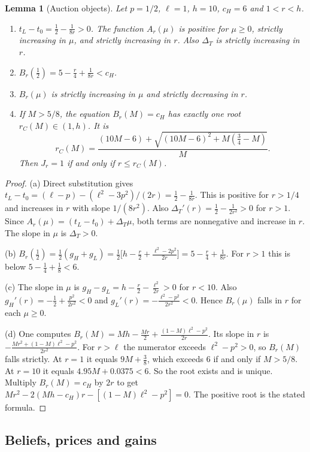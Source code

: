 \documentclass[12pt]{article}
\newtheorem{lemma}{Lemma}
\theoremstyle{definition}
\newcommand{\cH}{c_H}
\begin{document}
\begin{lemma}[Auction objects]\label{l:auction}
Let $p=1/2$, $\ell=1$, $h=10$, $c_H=6$ and $1<r<h$.
\begin{enumerate}[label=(\alph*)]
\item $t_L-t_0=\tfrac12-\tfrac1{8r}>0$. The function $A_r(\mu)$ is positive for $\mu\ge 0$, strictly increasing in $\mu$, and strictly increasing in $r$. Also $\Delta_T$ is strictly increasing in $r$.
\item $B_r(\tfrac12)=5-\tfrac r4+\tfrac1{8r}<\cH$.
\item $B_r(\mu)$ is strictly increasing in $\mu$ and strictly decreasing in $r$.
\item If $M>5/8$, the equation $B_r(M)=\cH$ has exactly one root $r_C(M)\in(1,h)$.
It is
\[
r_C(M)=\frac{(10M-6)+\sqrt{(10M-6)^2+M(\tfrac34-M)}}{M}.
\]
Then $J_r=1$ if and only if $r\le r_C(M)$.
\end{enumerate}
\end{lemma}

\begin{proof}
(a) Direct substitution gives $t_L-t_0=(\ell-p)-(\ell^2-3p^2)/(2r)=\tfrac12-\tfrac1{8r}$.
This is positive for $r>1/4$ and increases in $r$ with slope $1/(8r^2)$.
Also $\Delta_T'(r)=\tfrac12-\tfrac1{2r^2}>0$ for $r>1$.
Since $A_r(\mu)=(t_L-t_0)+\Delta_T\mu$, both terms are nonnegative and increase in $r$.
The slope in $\mu$ is $\Delta_T>0$.

(b) $B_r(\tfrac12)=\tfrac12(g_H+g_L)=\tfrac12\bigl[h-\tfrac r2+\tfrac{\ell^2-2p^2}{2r}\bigr]=5-\tfrac r4+\tfrac1{8r}$.
For $r>1$ this is below $5-\tfrac14+\tfrac18<6$.

(c) The slope in $\mu$ is $g_H-g_L=h-\tfrac r2-\tfrac{\ell^2}{2r}>0$ for $r<10$.
Also $g_H'(r)=-\tfrac12+\tfrac{p^2}{2r^2}<0$ and $g_L'(r)=-\tfrac{\ell^2-p^2}{2r^2}<0$.
Hence $B_r(\mu)$ falls in $r$ for each $\mu\ge 0$.

(d) One computes $B_r(M)=Mh-\tfrac{Mr}2+\tfrac{(1-M)\ell^2-p^2}{2r}$.
Its slope in $r$ is $-\tfrac{Mr^2+(1-M)\ell^2-p^2}{2r^2}$.
For $r>\ell$ the numerator exceeds $\ell^2-p^2>0$, so $B_r(M)$ falls strictly.
At $r=1$ it equals $9M+\tfrac38$, which exceeds $6$ if and only if $M>5/8$.
At $r=10$ it equals $4.95M+0.0375<6$.
So the root exists and is unique.
Multiply $B_r(M)=\cH$ by $2r$ to get $Mr^2-2(Mh-\cH)r-[(1-M)\ell^2-p^2]=0$.
The positive root is the stated formula.
\end{proof}

\subsection{Beliefs, prices and gains}
\end{document}
